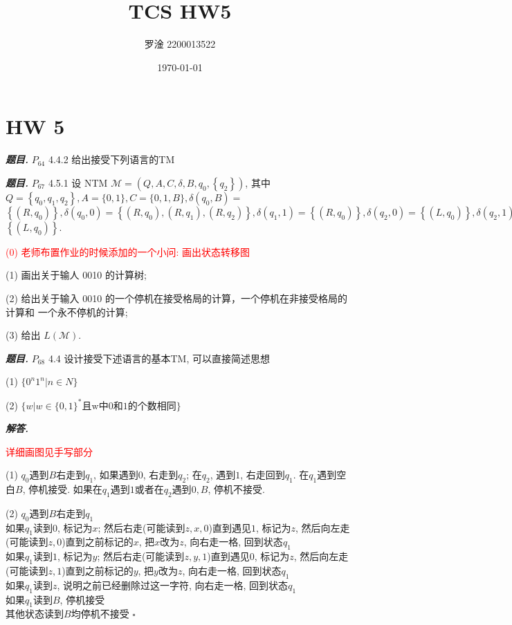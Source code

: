 \documentclass[10pt, a4paper, oneside]{ctexart}
\title{\textbf{TCS HW5}}
\author{罗淦 2200013522}
\date{\today}
\newenvironment{problem}{\begin{framed}\par\noindent\textbf{\textit{题目. }}}{\end{framed}\par}
\newenvironment{solution}{%
  \par\noindent\textbf{\textit{解答. }}\ignorespaces
}{%
  \hfill\ensuremath{\square}\par %
}
\begin{document}
\maketitle


\section{HW 5}
\begin{problem}
    $P_{64}$ 4.4.2 给出接受下列语言的TM
    \end{problem}
    
    \begin{problem}
    $P_{67}$ 4.5.1 设 NTM $\mathcal{M}=\left(Q, A, C, \delta, B, q_0,\left\{q_2\right\}\right)$, 其中 $Q=\left\{q_0, q_1, q_2\right\}, A=\{0,1\}, C=\{0,1, B\}, \delta\left(q_0, B\right)=$ $\left\{\left(R, q_0\right)\right\}, \delta\left(q_0, 0\right)=\left\{\left(R, q_0\right),\left(R, q_1\right),\left(R, q_2\right)\right\}, \delta\left(q_1, 1\right)=\left\{\left(R, q_0\right)\right\}, \delta\left(q_2, 0\right)=\left\{\left(L, q_0\right)\right\}, \delta\left(q_2, 1\right)=$ $\left\{\left(L, q_0\right)\right\}$.
    
    \textcolor{red}{(0) 老师布置作业的时候添加的一个小问: 画出状态转移图}
    
    (1) 画出关于输人 0010 的计算树;
    
    (2) 给出关于输入 0010 的一个停机在接受格局的计算，一个停机在非接受格局的计算和 一个永不停机的计算;
    
    (3) 给出 $L(\mathscr{M})$.
    \end{problem}

    \begin{problem}
        $P_{68}$ 4.4 设计接受下述语言的基本TM, 可以直接简述思想
        
        (1) $\{0^n1^n|n\in N\}$
        
        (2) $\{w|w\in \{0,1\}^* \text{且w中0和1的个数相同}\}$
        \end{problem}
        \begin{solution}
        \textcolor{red}{详细画图见手写部分}
        
        (1) $q_0$遇到$B$右走到$q_1$, 如果遇到$0$, 右走到$q_2$; 在$q_2$, 遇到$1$, 右走回到$q_1$. 在$q_1$遇到空白$B$, 停机接受. 如果在$q_1$遇到$1$或者在$q_2$遇到$0,B$, 停机不接受. 
        
        (2) $q_0$遇到$B$右走到$q_1$\\
        如果$q_1$读到$0$, 标记为$x$; 然后右走(可能读到$z,x,0$)直到遇见$1$, 标记为$z$, 然后向左走(可能读到$z,0$)直到之前标记的$x$, 把$x$改为$z$, 向右走一格, 回到状态$q_1$\\
        如果$q_1$读到$1$, 标记为$y$; 然后右走(可能读到$z,y,1$)直到遇见$0$, 标记为$z$, 然后向左走(可能读到$z,1$)直到之前标记的$y$, 把$y$改为$z$, 向右走一格, 回到状态$q_1$\\
        如果$q_1$读到$z$, 说明之前已经删除过这一字符, 向右走一格, 回到状态$q_1$\\
        如果$q_1$读到$B$, 停机接受\\
        其他状态读到$B$均停机不接受
        \end{solution}
        
\end{document}
